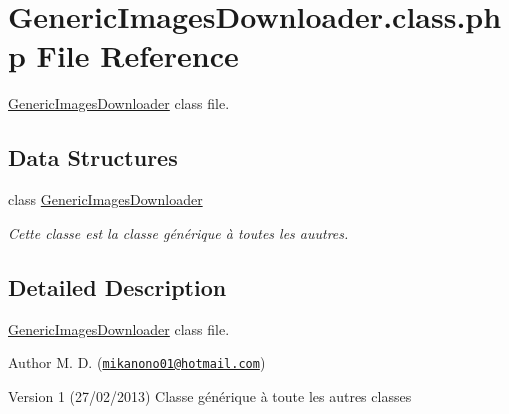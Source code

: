 \hypertarget{_generic_images_downloader_8class_8php}{\section{Generic\-Images\-Downloader.\-class.\-php File Reference}
\label{_generic_images_downloader_8class_8php}
}


\hyperlink{class_generic_images_downloader}{Generic\-Images\-Downloader} class file.  


\subsection*{Data Structures}
\begin{DoxyCompactItemize}
\item 
class \hyperlink{class_generic_images_downloader}{Generic\-Images\-Downloader}
\begin{DoxyCompactList}\small\item\em Cette classe est la classe générique à toutes les auutres. \end{DoxyCompactList}\end{DoxyCompactItemize}


\subsection{Detailed Description}
\hyperlink{class_generic_images_downloader}{Generic\-Images\-Downloader} class file. \begin{DoxyAuthor}{Author}
M. D. (\href{mailto:mikanono01@hotmail.com}{\tt mikanono01@hotmail.\-com}) 
\end{DoxyAuthor}
\begin{DoxyVersion}{Version}
1 (27/02/2013) Classe générique à toute les autres classes 
\end{DoxyVersion}
